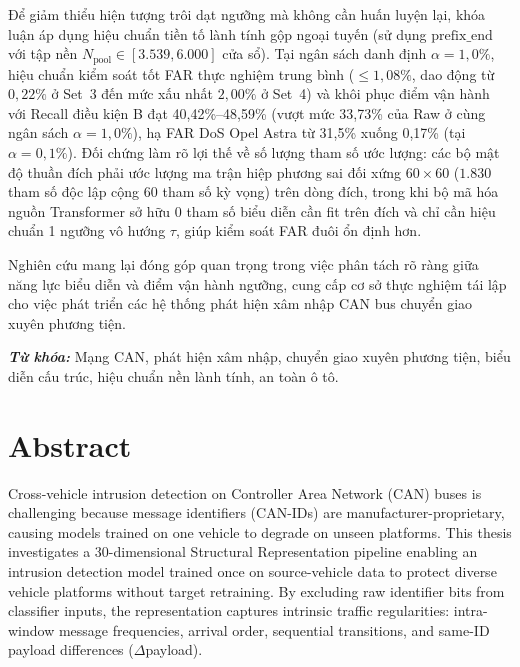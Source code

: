 \documentclass[12pt, a4paper, reqno, oneside]{book}
\newcommand\chap[1]{%
  \clearpage\phantomsection%
  \chapter*{#1}%
  \addcontentsline{toc}{chapter}{#1}%
  \markboth{#1}{}%
}
\begin{document}
Để giảm thiểu hiện tượng trôi dạt ngưỡng mà không cần huấn luyện lại, khóa luận áp dụng hiệu chuẩn tiền tố lành tính gộp ngoại tuyến (sử dụng $\mathrm{prefix\_end}$ với tập nền $N_{\text{pool}} \in [3.539, 6.000]$ cửa sổ). Tại ngân sách danh định $\alpha = 1{,}0\%$, hiệu chuẩn kiểm soát tốt FAR thực nghiệm trung bình ($\le 1{,}08\%$, dao động từ $0{,}22\%$ ở Set~3 đến mức xấu nhất $2{,}00\%$ ở Set~4) và khôi phục điểm vận hành với Recall điều kiện B đạt 40,42\%--48,59\% (vượt mức 33,73\% của Raw ở cùng ngân sách $\alpha = 1{,}0\%$), hạ FAR DoS Opel Astra từ 31,5\% xuống 0,17\% (tại $\alpha = 0{,}1\%$). Đối chứng làm rõ lợi thế về số lượng tham số ước lượng: các bộ mật độ thuần đích phải ước lượng ma trận hiệp phương sai đối xứng $60\times 60$ ($1.830$ tham số độc lập cộng $60$ tham số kỳ vọng) trên dòng đích, trong khi bộ mã hóa nguồn Transformer sở hữu 0 tham số biểu diễn cần fit trên đích và chỉ cần hiệu chuẩn 1 ngưỡng vô hướng $\tau$, giúp kiểm soát FAR đuôi ổn định hơn.

Nghiên cứu mang lại đóng góp quan trọng trong việc phân tách rõ ràng giữa năng lực biểu diễn và điểm vận hành ngưỡng, cung cấp cơ sở thực nghiệm tái lập cho việc phát triển các hệ thống phát hiện xâm nhập CAN bus chuyển giao xuyên phương tiện.

\vspace{-0.9em}
\noindent \textit{\textbf{Từ khóa:}} Mạng CAN, phát hiện xâm nhập, chuyển giao xuyên phương tiện, biểu diễn cấu trúc, hiệu chuẩn nền lành tính, an toàn ô tô.

\newpage

\chap{Abstract}
\vspace{4pt}

Cross-vehicle intrusion detection on Controller Area Network (CAN) buses is challenging because message identifiers (CAN-IDs) are manufacturer-proprietary, causing models trained on one vehicle to degrade on unseen platforms. This thesis investigates a 30-dimensional Structural Representation pipeline enabling an intrusion detection model trained once on source-vehicle data to protect diverse vehicle platforms without target retraining. By excluding raw identifier bits from classifier inputs, the representation captures intrinsic traffic regularities: intra-window message frequencies, arrival order, sequential transitions, and same-ID payload differences ($\Delta$payload).
\end{document}
